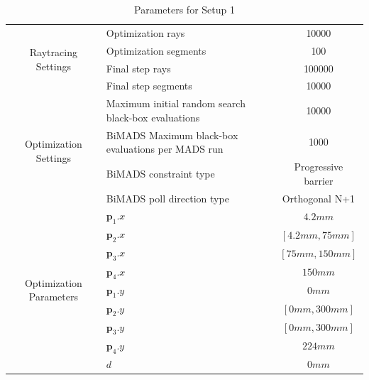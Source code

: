 \documentclass[a4paper,10pt]{article}
\renewcommand{\vec}[1]{\mathbf{#1}}
\begin{document}
    \begin{table}
    \centering
    \setlength\tabcolsep{8pt}
    \renewcommand{\arraystretch}{1.5}
    \begin{tabular}{| c | p{40mm} | c |}
        \hline
        \multirow{4}{*}{Raytracing Settings} & Optimization rays & 10000 \\
        \cline{2-3}
        & Optimization segments & 100 \\
        \cline{2-3}
        & Final step rays & 100000 \\
        \cline{2-3}
        & Final step segments & 10000 \\
        \hline
        \multirow{4}{*}{Optimization Settings} & Maximum initial random search black-box evaluations & 10000 \\
        \cline{2-3}
        & BiMADS Maximum black-box evaluations per MADS run & 1000 \\
        \cline{2-3}
        & BiMADS constraint type & Progressive barrier \\
        \cline{2-3}
        & BiMADS poll direction type & Orthogonal N+1 \\
        \hline
        \multirow{9}{*}{Optimization Parameters} & 
        $\vec{p}_1.x$ & $4.2mm$ \\
        \cline{2-3}
        & $\vec{p}_2.x$ & $[4.2mm, 75mm]$\\
        \cline{2-3}
        & $\vec{p}_3.x$ & $[75mm, 150mm]$\\ 
        \cline{2-3}
        & $\vec{p}_4.x$ & $150mm$\\ 
        \cline{2-3}
        & $\vec{p}_1.y$ & $0mm$ \\
        \cline{2-3}
        & $\vec{p}_2.y$ & $[0mm, 300mm]$\\
        \cline{2-3}
        & $\vec{p}_3.y$ & $[0mm, 300mm]$\\ 
        \cline{2-3}
        & $\vec{p}_4.y$ & $224mm$\\ 
        \cline{2-3}
        & $d$ & $0mm$\\ 
        \hline 
    \end{tabular}
    \label{tab:setup1_parameters}
    \caption{Parameters for Setup 1}
    \end{table}
\end{document}
